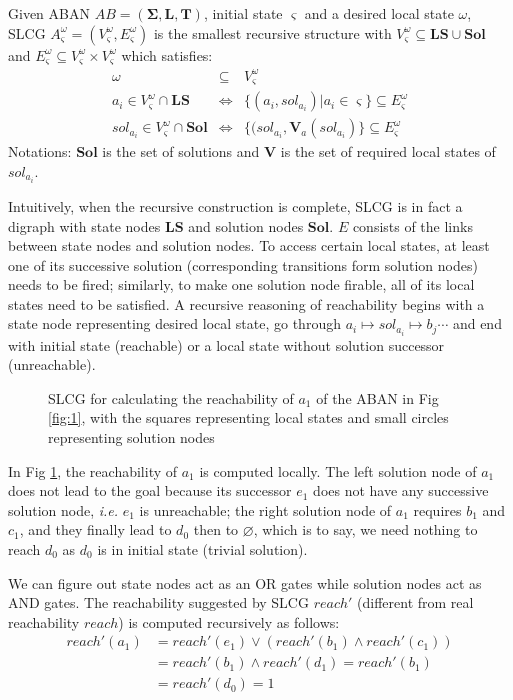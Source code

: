 \documentclass[runningheads]{llncs}
\newcommand{\omesi}{^\omega_\varsigma}
\begin{document}
\begin{definition}[SLCG]\label{defLCG}
Given ABAN $AB = (\mathbf{\Sigma},\mathbf{L},\mathbf{T})$, initial state $\varsigma$ and a desired local state $\omega$, SLCG $A\omesi= (V\omesi,E\omesi)$ is the smallest recursive structure with $V\omesi \subseteq \mathbf{LS}\cup \mathbf{Sol}$ and $E\omesi \subseteq V\omesi\times V\omesi$ which satisfies:
\begin{eqnarray*}
\omega&\subseteq& V\omesi \\
a_i\in V\omesi\cap \mathbf{LS} &\Leftrightarrow& \{ (a_i, sol_{a_i})| a_i\in \varsigma\}\subseteq E\omesi \\
sol_{a_i}\in V\omesi \cap \mathbf{Sol}&\Leftrightarrow& \{ (sol_{a_i},\mathbf{V}_a (sol_{a_i})\}\subseteq E\omesi
\end{eqnarray*}
Notations: $\mathbf{Sol}$ is the set of solutions and $\mathbf{V}$ is the set of required local states of $sol_{a_i}$.
\end{definition}
Intuitively, when the recursive construction is complete, SLCG is in fact a digraph with state nodes $\mathbf{LS}$ and solution nodes $\mathbf{Sol}$. $E$ consists of the links between state nodes and solution nodes. To access certain local states, at least one of its successive solution (corresponding transitions form solution nodes) needs to be fired; similarly, to make one solution node firable, all of its local states need to be satisfied. A recursive reasoning of reachability begins with a state node representing desired local state, go through $a_i\mapsto sol_{a_i}\mapsto b_j \cdots$ and end with initial state (reachable) or a local state without solution successor (unreachable).

\begin{figure}[!ht]
\centering

\caption{SLCG for calculating the reachability of $a_1$ of the ABAN in Fig \ref{fig:1}, with the squares representing local states and small circles representing solution nodes}
\label{fig:2}
\end{figure}
In Fig \ref{fig:2}, the reachability of $a_1$ is computed locally. The left solution node of $a_1$ does not lead to the goal because its successor $e_1$ does not have any successive solution node, \textit{i.e.} $e_1$ is unreachable; the right solution node of $a_1$ requires $b_1$ and $c_1$, and they finally lead to $d_0$ then to $\varnothing$, which is to say, we need nothing to reach $d_0$ as $d_0$ is in initial state (trivial solution).

We can figure out state nodes act as an OR gates while solution nodes act as AND gates. The reachability suggested by SLCG $reach'$ (different from real reachability $reach$) is computed recursively as follows:
\begin{align*}
reach'(a_1)&=reach'(e_1)\lor (reach'(b_1)\land reach'(c_1))\\
&=reach'(b_1)\land reach'(d_1)=reach'(b_1)\\
&=reach'(d_0)=1
\end{align*}
\end{document}
